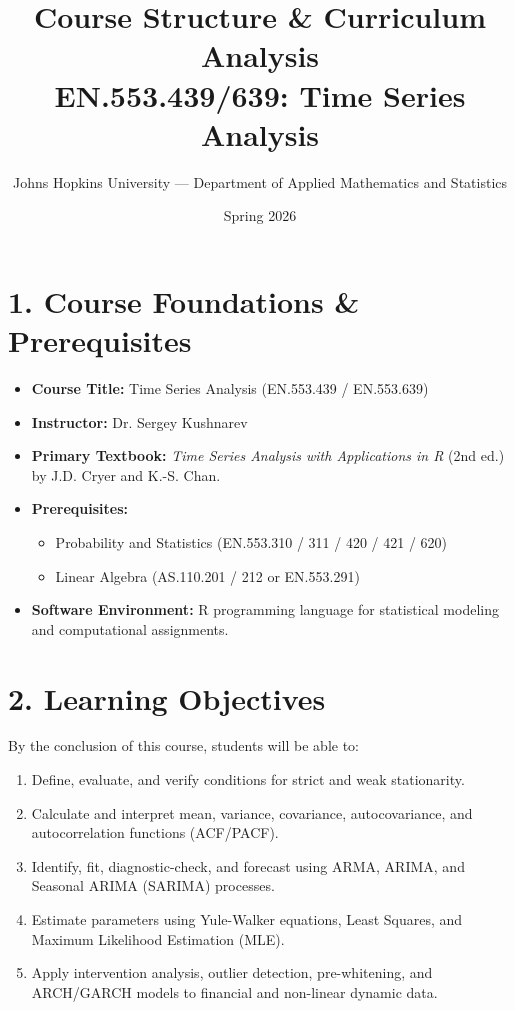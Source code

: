 \documentclass{article}
\title{\textbf{Course Structure \& Curriculum Analysis}\\
\large EN.553.439/639: Time Series Analysis}
\author{Johns Hopkins University --- Department of Applied Mathematics and Statistics}
\date{Spring 2026}
\begin{document}
\maketitle

\section*{1. Course Foundations \& Prerequisites}
\begin{itemize}
    \item \textbf{Course Title:} Time Series Analysis (EN.553.439 / EN.553.639)
    \item \textbf{Instructor:} Dr. Sergey Kushnarev
    \item \textbf{Primary Textbook:} \textit{Time Series Analysis with Applications in R} (2nd ed.) by J.D. Cryer and K.-S. Chan.
    \item \textbf{Prerequisites:} 
    \begin{itemize}
        \item Probability and Statistics (EN.553.310 / 311 / 420 / 421 / 620)
        \item Linear Algebra (AS.110.201 / 212 or EN.553.291)
    \end{itemize}
    \item \textbf{Software Environment:} R programming language for statistical modeling and computational assignments.
\end{itemize}

\section*{2. Learning Objectives}
By the conclusion of this course, students will be able to:
\begin{enumerate}
    \item Define, evaluate, and verify conditions for strict and weak stationarity.
    \item Calculate and interpret mean, variance, covariance, autocovariance, and autocorrelation functions (ACF/PACF).
    \item Identify, fit, diagnostic-check, and forecast using ARMA, ARIMA, and Seasonal ARIMA (SARIMA) processes.
    \item Estimate parameters using Yule-Walker equations, Least Squares, and Maximum Likelihood Estimation (MLE).
    \item Apply intervention analysis, outlier detection, pre-whitening, and ARCH/GARCH models to financial and non-linear dynamic data.
\end{enumerate}
\end{document}
